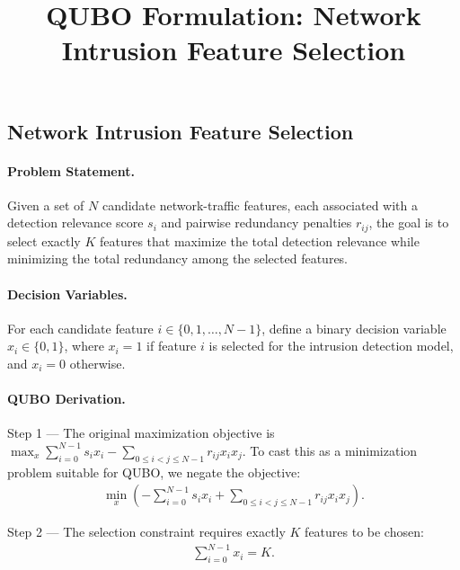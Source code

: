 \documentclass[12pt]{article}
\title{QUBO Formulation: Network Intrusion Feature Selection}
\date{}
\begin{document}
\maketitle

\subsection*{Network Intrusion Feature Selection}

\paragraph{Problem Statement.}
Given a set of $N$ candidate network-traffic features, each associated with a detection relevance score $s_i$ and pairwise redundancy penalties $r_{ij}$, the goal is to select exactly $K$ features that maximize the total detection relevance while minimizing the total redundancy among the selected features.

\paragraph{Decision Variables.}
For each candidate feature $i \in \{0, 1, \dots, N-1\}$, define a binary decision variable $x_i \in \{0,1\}$, where $x_i = 1$ if feature $i$ is selected for the intrusion detection model, and $x_i = 0$ otherwise.

\paragraph{QUBO Derivation.}
Step 1 --- The original maximization objective is $\max_{x} \sum_{i=0}^{N-1} s_i x_i - \sum_{0 \le i < j \le N-1} r_{ij} x_i x_j$. To cast this as a minimization problem suitable for QUBO, we negate the objective:
\begin{align}
  \min_{x} \left( -\sum_{i=0}^{N-1} s_i x_i + \sum_{0 \le i < j \le N-1} r_{ij} x_i x_j \right).
\end{align}

Step 2 --- The selection constraint requires exactly $K$ features to be chosen:
\begin{align}
  \sum_{i=0}^{N-1} x_i = K.
\end{align}
\end{document}
